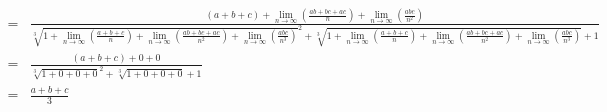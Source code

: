 \documentclass[a4paper,german,12pt,smallheadings]{scrartcl}
\begin{document}
\begin{landscape}
\begin{align*}
  = &\frac{(a+b+c) + \lim_{n \to \infty} \left(\frac{ab+bc+ac}{n}\right) + \lim_{n \to \infty}\left(\frac{abc}{n^2}\right)}{\sqrt[3]{1 + \lim_{n \to \infty} \left(\frac{a+b+c}{n}\right) + \lim_{n \to \infty} \left(\frac{ab+bc+ac}{n^2}\right) + \lim_{n \to \infty}\left(\frac{abc}{n^3}\right)}^2 + \sqrt[3]{1 + \lim_{n \to \infty} \left(\frac{a+b+c}{n}\right) + \lim_{n \to \infty} \left(\frac{ab+bc+ac}{n^2}\right) + \lim_{n \to \infty} \left(\frac{abc}{n^3}\right)} + 1} \\
  = &\frac{(a+b+c) + 0 + 0}{\sqrt[3]{1 + 0 + 0 + 0}^2 + \sqrt[3]{1 + 0 + 0 + 0} + 1} \\
  = &\frac{a+b+c}{3}
\end{align*}
\end{landscape}
\end{document}
